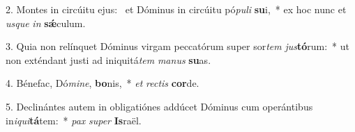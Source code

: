 2. Montes in circúitu ejus: \dag\  et Dóminus in circúitu pó\textit{pu}\textit{li} \textbf{su}i,~*  ex hoc nunc et \textit{us}\textit{que} \textit{in} \textbf{sǽ}culum.\

3. Quia non relínquet Dóminus virgam peccatórum super sor\textit{tem} \textit{jus}\textbf{tó}rum:~*  ut non exténdant justi ad iniquitá\textit{tem} \textit{ma}\textit{nus} \textbf{su}as.\

4. Bénefac, Dó\textit{mi}\textit{ne}, \textbf{bo}nis,~*  \textit{et} \textit{rec}\textit{tis} \textbf{cor}de.\

5. Declinántes autem in obligatiónes addúcet Dóminus cum operántibus in\textit{i}\textit{qui}\textbf{tá}tem:~*  \textit{pax} \textit{su}\textit{per} \textbf{Is}raël.\

